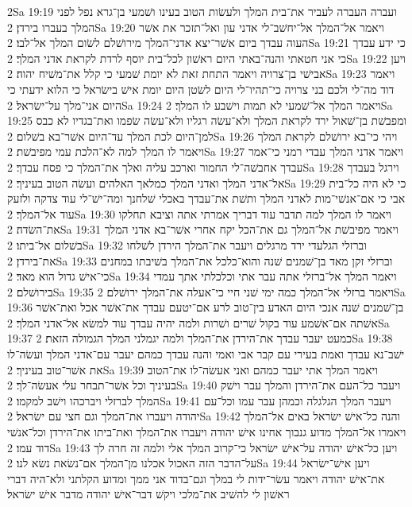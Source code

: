 2Sa 19:19  ועברה העברה לעביר את־בית המלך ולעשׂות הטוב בעינו ושׁמעי בן־גרא נפל לפני המלך בעברו בירדן׃
2Sa 19:20  ויאמר אל־המלך אל־יחשׁב־לי אדני עון ואל־תזכר את אשׁר העוה עבדך ביום אשׁר־יצא אדני־המלך מירושׁלם לשׂום המלך אל־לבו׃
2Sa 19:21  כי ידע עבדך כי אני חטאתי והנה־באתי היום ראשׁון לכל־בית יוסף לרדת לקראת אדני המלך׃
2Sa 19:22  ויען אבישׁי בן־צרויה ויאמר התחת זאת לא יומת שׁמעי כי קלל את־משׁיח יהוה׃
2Sa 19:23  ויאמר דוד מה־לי ולכם בני צרויה כי־תהיו־לי היום לשׂטן היום יומת אישׁ בישׂראל כי הלוא ידעתי כי היום אני־מלך על־ישׂראל׃
2Sa 19:24  ויאמר המלך אל־שׁמעי לא תמות וישׁבע לו המלך׃
2Sa 19:25  ומפבשׁת בן־שׁאול ירד לקראת המלך ולא־עשׂה רגליו ולא־עשׂה שׂפמו ואת־בגדיו לא כבס למן־היום לכת המלך עד־היום אשׁר־בא בשׁלום׃
2Sa 19:26  ויהי כי־בא ירושׁלם לקראת המלך ויאמר לו המלך למה לא־הלכת עמי מפיבשׁת׃
2Sa 19:27  ויאמר אדני המלך עבדי רמני כי־אמר עבדך אחבשׁה־לי החמור וארכב עליה ואלך את־המלך כי פסח עבדך׃
2Sa 19:28  וירגל בעבדך אל־אדני המלך ואדני המלך כמלאך האלהים ועשׂה הטוב בעיניך׃
2Sa 19:29  כי לא היה כל־בית אבי כי אם־אנשׁי־מות לאדני המלך ותשׁת את־עבדך באכלי שׁלחנך ומה־ישׁ־לי עוד צדקה ולזעק עוד אל־המלך׃
2Sa 19:30  ויאמר לו המלך למה תדבר עוד דבריך אמרתי אתה וציבא תחלקו את־השׂדה׃
2Sa 19:31  ויאמר מפיבשׁת אל־המלך גם את־הכל יקח אחרי אשׁר־בא אדני המלך בשׁלום אל־ביתו׃
2Sa 19:32  וברזלי הגלעדי ירד מרגלים ויעבר את־המלך הירדן לשׁלחו את־בירדן׃
2Sa 19:33  וברזלי זקן מאד בן־שׁמנים שׁנה והוא־כלכל את־המלך בשׁיבתו במחנים כי־אישׁ גדול הוא מאד׃
2Sa 19:34  ויאמר המלך אל־ברזלי אתה עבר אתי וכלכלתי אתך עמדי בירושׁלם׃
2Sa 19:35  ויאמר ברזלי אל־המלך כמה ימי שׁני חיי כי־אעלה את־המלך ירושׁלם׃
2Sa 19:36  בן־שׁמנים שׁנה אנכי היום האדע בין־טוב לרע אם־יטעם עבדך את־אשׁר אכל ואת־אשׁר אשׁתה אם־אשׁמע עוד בקול שׁרים ושׁרות ולמה יהיה עבדך עוד למשׂא אל־אדני המלך׃
2Sa 19:37  כמעט יעבר עבדך את־הירדן את־המלך ולמה יגמלני המלך הגמולה הזאת׃
2Sa 19:38  ישׁב־נא עבדך ואמת בעירי עם קבר אבי ואמי והנה עבדך כמהם יעבר עם־אדני המלך ועשׂה־לו את אשׁר־טוב בעיניך׃
2Sa 19:39  ויאמר המלך אתי יעבר כמהם ואני אעשׂה־לו את־הטוב בעיניך וכל אשׁר־תבחר עלי אעשׂה־לך׃
2Sa 19:40  ויעבר כל־העם את־הירדן והמלך עבר וישׁק המלך לברזלי ויברכהו וישׁב למקמו׃
2Sa 19:41  ויעבר המלך הגלגלה וכמהן עבר עמו וכל־עם יהודה ויעברו את־המלך וגם חצי עם ישׂראל׃
2Sa 19:42  והנה כל־אישׁ ישׂראל באים אל־המלך ויאמרו אל־המלך מדוע גנבוך אחינו אישׁ יהודה ויעברו את־המלך ואת־ביתו את־הירדן וכל־אנשׁי דוד עמו׃
2Sa 19:43  ויען כל־אישׁ יהודה על־אישׁ ישׂראל כי־קרוב המלך אלי ולמה זה חרה לך על־הדבר הזה האכול אכלנו מן־המלך אם־נשׂאת נשׂא לנו׃
2Sa 19:44  ויען אישׁ־ישׂראל את־אישׁ יהודה ויאמר עשׂר־ידות לי במלך וגם־בדוד אני ממך ומדוע הקלתני ולא־היה דברי ראשׁון לי להשׁיב את־מלכי ויקשׁ דבר־אישׁ יהודה מדבר אישׁ ישׂראל׃
